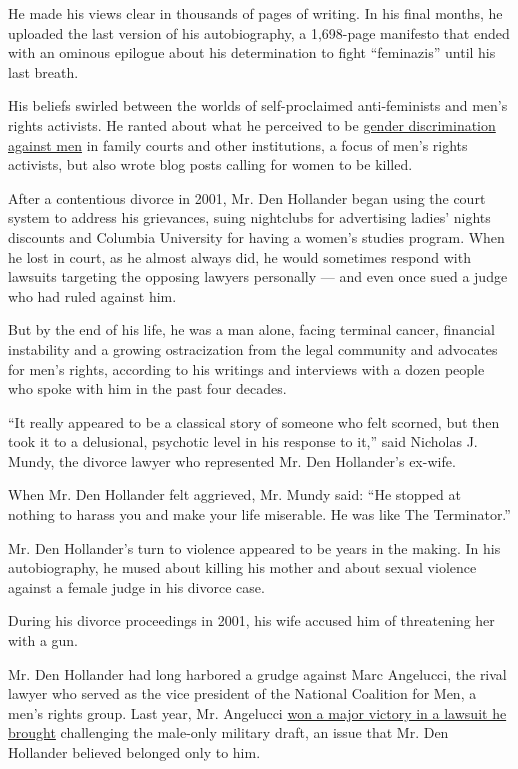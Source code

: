 He made his views clear in thousands of pages of writing. In his final
months, he uploaded the last version of his autobiography, a 1,698-page
manifesto that ended with an ominous epilogue about his determination to
fight ``feminazis'' until his last breath.

His beliefs swirled between the worlds of self-proclaimed anti-feminists
and men's rights activists. He ranted about what he perceived to be
\href{https://www.nytimes.com/2018/07/13/style/mens-rights-movement.html}{gender
discrimination against men} in family courts and other institutions, a
focus of men's rights activists, but also wrote blog posts calling for
women to be killed.

After a contentious divorce in 2001, Mr. Den Hollander began using the
court system to address his grievances, suing nightclubs for advertising
ladies' nights discounts and Columbia University for having a women's
studies program. When he lost in court, as he almost always did, he
would sometimes respond with lawsuits targeting the opposing lawyers
personally --- and even once sued a judge who had ruled against him.

But by the end of his life, he was a man alone, facing terminal cancer,
financial instability and a growing ostracization from the legal
community and advocates for men's rights, according to his writings and
interviews with a dozen people who spoke with him in the past four
decades.

``It really appeared to be a classical story of someone who felt
scorned, but then took it to a delusional, psychotic level in his
response to it,'' said Nicholas J. Mundy, the divorce lawyer who
represented Mr. Den Hollander's ex-wife.

When Mr. Den Hollander felt aggrieved, Mr. Mundy said: ``He stopped at
nothing to harass you and make your life miserable. He was like The
Terminator.''

Mr. Den Hollander's turn to violence appeared to be years in the making.
In his autobiography, he mused about killing his mother and about sexual
violence against a female judge in his divorce case.

During his divorce proceedings in 2001, his wife accused him of
threatening her with a gun.

Mr. Den Hollander had long harbored a grudge against Marc Angelucci, the
rival lawyer who served as the vice president of the National Coalition
for Men, a men's rights group. Last year, Mr. Angelucci
\href{https://www.nytimes.com/2019/02/24/us/military-draft-men-unconstitutional.html}{won
a major victory in a lawsuit he brought} challenging the male-only
military draft, an issue that Mr. Den Hollander believed belonged only
to him.

